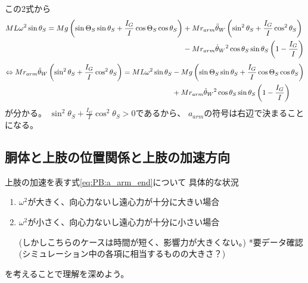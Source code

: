 \documentclass[a4paper,11pt]{jsarticle}
\begin{document}
この2式から
\begin{align}
  ML\omega^2 \sin\theta_S
  = Mg\left( \sin\Theta_S \sin\theta_S + \frac{I_G}{I}\cos\Theta_S \cos\theta_S \right)
  & + Mr_{arm}\ddot{\theta}_W\left( \sin^2\theta_S + \frac{I_G}{I}\cos^2\theta_S \right)
  \notag
  \\
  & - Mr_{arm}\dot{\theta}_W{}^2\cos\theta_S \sin\theta_S\left( 1 - \frac{I_G}{I} \right)
\end{align}
\begin{align}
  \Leftrightarrow
  Mr_{arm}\ddot{\theta}_W\left( \sin^2\theta_S + \frac{I_G}{I}\cos^2\theta_S \right)
  = ML\omega^2 \sin\theta_S
  &- Mg\left( \sin\Theta_S \sin\theta_S + \frac{I_G}{I}\cos\Theta_S \cos\theta_S \right)
  \notag
  \\
  &+ Mr_{arm}\dot{\theta}_W{}^2\cos\theta_S \sin\theta_S\left( 1 - \frac{I_G}{I} \right)
  \label{eq:PB:a_arm_end}
\end{align}
が分かる。
$\sin^2\theta_S + \frac{I_G}{I}\cos^2\theta_S > 0$であるから、
$a_{arm}$の符号は右辺で決まることになる。

\subsection{胴体と上肢の位置関係と上肢の加速方向}

上肢の加速を表す式\ref{eq:PB:a_arm_end}について
具体的な状況
\begin{enumerate}
  \item $\omega^2$が大きく、向心力ないし遠心力が十分に大きい場合
  \item $\omega^2$が小さく、向心力ないし遠心力が十分に小さい場合
  
  (しかしこちらのケースは時間が短く、影響力が大きくない。)
  *要データ確認(シミュレーション中の各項に相当するものの大きさ？)
\end{enumerate}
を考えることで理解を深めよう。
\end{document}
